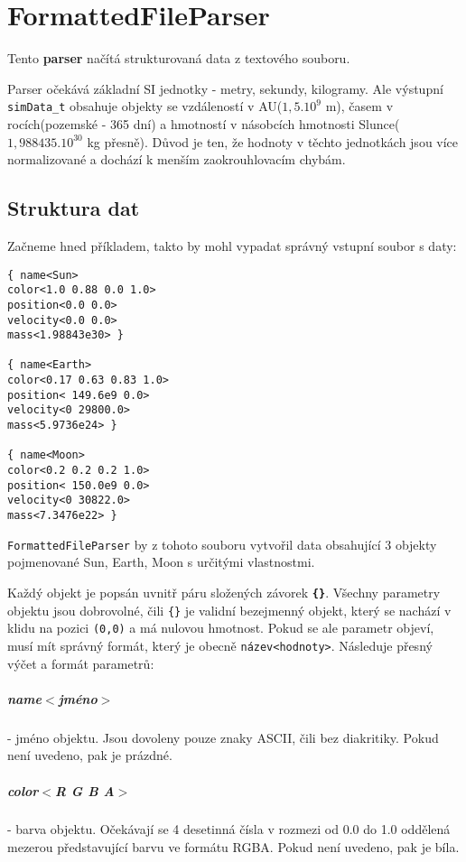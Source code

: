 \chapter{FormattedFileParser}
Tento \textbf{parser} načítá strukturovaná data z textového souboru. 

Parser očekává základní SI jednotky - metry, sekundy, kilogramy. Ale výstupní \texttt{simData\_t} obsahuje objekty se vzdáleností v AU($ 1,5.10^9 $ m), časem v rocích(pozemské - 365 dní) a hmotností v násobcích hmotnosti Slunce($ 1,988435.10^{30} $ kg přesně). Důvod je ten, že hodnoty v těchto jednotkách jsou více normalizované a dochází k menším zaokrouhlovacím chybám.

\section{Struktura dat}
\label{sec:strukturaDat}
Začneme hned příkladem, takto by mohl vypadat správný vstupní soubor s daty:
\begin{lstlisting}
{ name<Sun>
color<1.0 0.88 0.0 1.0>
position<0.0 0.0>
velocity<0.0 0.0>
mass<1.98843e30> }

{ name<Earth>
color<0.17 0.63 0.83 1.0>
position< 149.6e9 0.0>
velocity<0 29800.0>
mass<5.9736e24> }

{ name<Moon>
color<0.2 0.2 0.2 1.0>
position< 150.0e9 0.0>
velocity<0 30822.0>
mass<7.3476e22> }
\end{lstlisting}
\texttt{FormattedFileParser} by z tohoto souboru vytvořil data obsahující 3 objekty pojmenované Sun, Earth, Moon s určitými vlastnostmi.

Každý objekt je popsán uvnitř páru složených závorek \textbf{\texttt{\{\}}}.
Všechny parametry objektu jsou dobrovolné, čili \lstinline|{}| je validní bezejmenný objekt, který se nachází v klidu na pozici \texttt{(0,0)} a má nulovou hmotnost. Pokud se ale parametr objeví, musí mít správný formát, který je obecně \texttt{název<hodnoty>}. Následuje přesný výčet a formát parametrů:
\paragraph{name$ < $jméno$ > $ } - jméno objektu. Jsou dovoleny pouze znaky ASCII, čili bez diakritiky. Pokud není uvedeno, pak je prázdné.
\paragraph{color$ < $R G B A$ > $} - barva objektu. Očekávají se 4 desetinná čísla v rozmezi od 0.0 do 1.0 oddělená mezerou představující barvu ve formátu RGBA. Pokud není uvedeno, pak je bíla.
